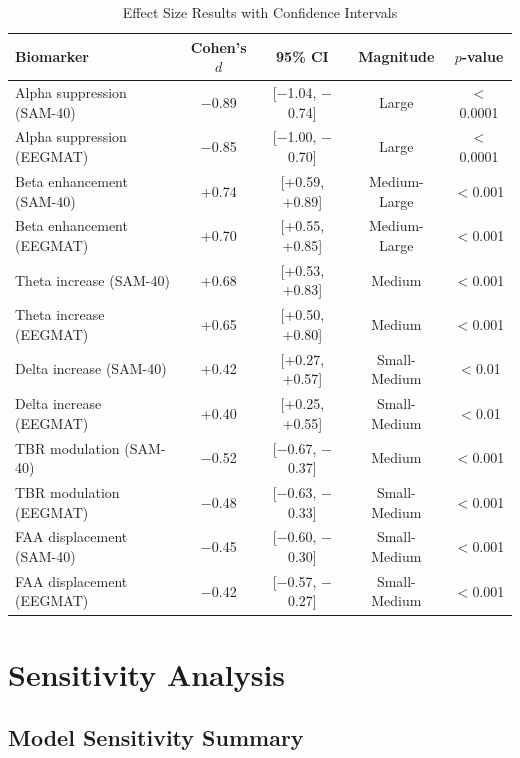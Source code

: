 \documentclass[11pt,a4paper]{article}
\begin{document}
\begin{table}[H]
\centering
\caption{Effect Size Results with Confidence Intervals}
\small
\begin{tabular}{lcccc}
\toprule
\textbf{Biomarker} & \textbf{Cohen's $d$} & \textbf{95\% CI} & \textbf{Magnitude} & \textbf{$p$-value} \\
\midrule
Alpha suppression (SAM-40) & $-$0.89 & [$-$1.04, $-$0.74] & Large & $<$0.0001 \\
Alpha suppression (EEGMAT) & $-$0.85 & [$-$1.00, $-$0.70] & Large & $<$0.0001 \\
Beta enhancement (SAM-40) & +0.74 & [+0.59, +0.89] & Medium-Large & $<$0.001 \\
Beta enhancement (EEGMAT) & +0.70 & [+0.55, +0.85] & Medium-Large & $<$0.001 \\
Theta increase (SAM-40) & +0.68 & [+0.53, +0.83] & Medium & $<$0.001 \\
Theta increase (EEGMAT) & +0.65 & [+0.50, +0.80] & Medium & $<$0.001 \\
Delta increase (SAM-40) & +0.42 & [+0.27, +0.57] & Small-Medium & $<$0.01 \\
Delta increase (EEGMAT) & +0.40 & [+0.25, +0.55] & Small-Medium & $<$0.01 \\
TBR modulation (SAM-40) & $-$0.52 & [$-$0.67, $-$0.37] & Medium & $<$0.001 \\
TBR modulation (EEGMAT) & $-$0.48 & [$-$0.63, $-$0.33] & Small-Medium & $<$0.001 \\
FAA displacement (SAM-40) & $-$0.45 & [$-$0.60, $-$0.30] & Small-Medium & $<$0.001 \\
FAA displacement (EEGMAT) & $-$0.42 & [$-$0.57, $-$0.27] & Small-Medium & $<$0.001 \\
\bottomrule
\end{tabular}
\end{table}

\section{Sensitivity Analysis}

\subsection{Model Sensitivity Summary}
\end{document}
